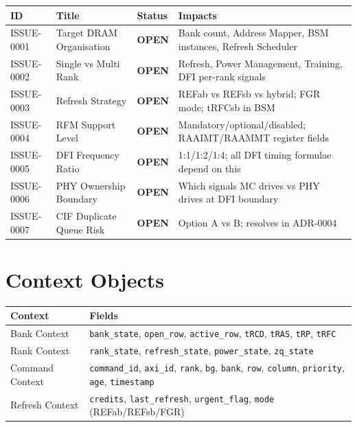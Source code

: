 \documentclass[10pt,a4paper]{article}
\newcommand{\Th}[1]{\cellcolor{thbg}\textbf{\small\color{acc1}#1}}
\newcommand{\RA}{\rowcolor{white}}
\newcommand{\RB}{\rowcolor{altbg}}
\newcommand{\RC}{\rowcolor{acc2lt}}
\begin{document}
\begin{center}
\begin{tabularx}{\linewidth}{@{} l l l X @{}}
\toprule
\Th{ID} & \Th{Title} & \Th{Status} & \Th{Impacts} \\
\midrule
\RC ISSUE-0001 & Target DRAM Organisation & \textcolor{critbdr}{\textbf{OPEN}} &
  Bank count, Address Mapper, BSM instances, Refresh Scheduler \\
\RC ISSUE-0002 & Single vs Multi Rank     & \textcolor{critbdr}{\textbf{OPEN}} &
  Refresh, Power Management, Training, DFI per-rank signals \\
\RC ISSUE-0003 & Refresh Strategy         & \textcolor{critbdr}{\textbf{OPEN}} &
  REFab vs REFsb vs hybrid; FGR mode; tRFCsb in BSM \\
\RC ISSUE-0004 & RFM Support Level        & \textcolor{critbdr}{\textbf{OPEN}} &
  Mandatory/optional/disabled; RAAIMT/RAAMMT register fields \\
\RC ISSUE-0005 & DFI Frequency Ratio      & \textcolor{critbdr}{\textbf{OPEN}} &
  1:1/1:2/1:4; all DFI timing formulae depend on this \\
\RB ISSUE-0006 & PHY Ownership Boundary   & \textcolor{acc2}{\textbf{OPEN}} &
  Which signals MC drives vs PHY drives at DFI boundary \\
\RA ISSUE-0007 & CIF Duplicate Queue Risk & \textcolor{acc2}{\textbf{OPEN}} &
  Option A vs B; resolves in ADR-0004 \\
\bottomrule
\end{tabularx}
\end{center}

\section{Context Objects}

\begin{center}
\begin{tabularx}{\linewidth}{@{} l X @{}}
\toprule
\Th{Context} & \Th{Fields} \\
\midrule
\RA Bank Context &
  \texttt{bank\_state}, \texttt{open\_row}, \texttt{active\_row},
  \texttt{tRCD}, \texttt{tRAS}, \texttt{tRP}, \texttt{tRFC} \\
\RB Rank Context &
  \texttt{rank\_state}, \texttt{refresh\_state}, \texttt{power\_state},
  \texttt{zq\_state} \\
\RA Command Context &
  \texttt{command\_id}, \texttt{axi\_id}, \texttt{rank}, \texttt{bg},
  \texttt{bank}, \texttt{row}, \texttt{column}, \texttt{priority},
  \texttt{age}, \texttt{timestamp} \\
\RB Refresh Context &
  \texttt{credits}, \texttt{last\_refresh}, \texttt{urgent\_flag},
  \texttt{mode} (REFab/REFsb/FGR) \\
\bottomrule
\end{tabularx}
\end{center}
\end{document}
